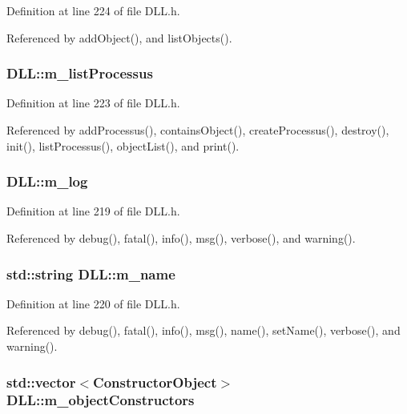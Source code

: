 Definition at line 224 of file DLL.h.

Referenced by addObject(), and listObjects().\hypertarget{classDLL_a197e92b990184a27a74f4a0456897bd5}{
\subsubsection[{m\_\-listProcessus}]{ {\bf DLL::m\_\-listProcessus}}}
\label{classDLL_a197e92b990184a27a74f4a0456897bd5}


Definition at line 223 of file DLL.h.

Referenced by addProcessus(), containsObject(), createProcessus(), destroy(), init(), listProcessus(), objectList(), and print().\hypertarget{classDLL_a6e66cd993e2d142b48691557ce8e4047}{
\subsubsection[{m\_\-log}]{ {\bf DLL::m\_\-log}}}
\label{classDLL_a6e66cd993e2d142b48691557ce8e4047}


Definition at line 219 of file DLL.h.

Referenced by debug(), fatal(), info(), msg(), verbose(), and warning().\hypertarget{classDLL_ad5e4d36d8c2575447f73acc2a703b405}{
\subsubsection[{m\_\-name}]{\setlength{\rightskip}{0pt plus 5cm}std::string {\bf DLL::m\_\-name}}}
\label{classDLL_ad5e4d36d8c2575447f73acc2a703b405}


Definition at line 220 of file DLL.h.

Referenced by debug(), fatal(), info(), msg(), name(), setName(), verbose(), and warning().\hypertarget{classDLL_a298d605445e22ef8147ae700848cd737}{
\subsubsection[{m\_\-objectConstructors}]{\setlength{\rightskip}{0pt plus 5cm}std::vector$<${\bf ConstructorObject}$>$ {\bf DLL::m\_\-objectConstructors}}}
\label{classDLL_a298d605445e22ef8147ae700848cd737}


